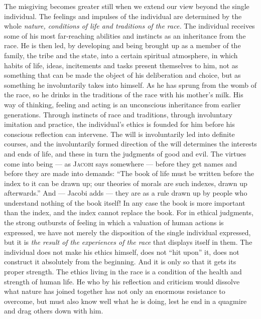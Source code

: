 \documentclass[12pt,a4paper,openany]{book}
\newcommand{\opage}[1]{\marginnote{\footnotesize\textit{[#1]}}}
\begin{document}
The misgiving becomes greater still when we extend our view beyond the single individual. The
feelings and impulses of the individual are determined by the whole \textit{nature, conditions of
life and traditions of the race.} The individual receives some of his most far-reaching abilities
and instincts as an inheritance from the race. He is then led, by developing and being brought up
as a member of the family, the tribe and the state, into a certain spiritual atmosphere, in which
habits of life, ideas, incitements and tasks present themselves to him, not as something that can
be made the object of his deliberation and choice, but as something he involuntarily takes into
himself. As he has sprung from the womb of the race, so he drinks in the traditions of the race
with his mother's milk. His way of thinking, feeling and acting is an unconscious inheritance from
earlier generations. Through instincts of race and traditions, through involuntary imitation and
practice, the individual's ethics is founded for him before his conscious reflection can
intervene. The will is involuntarily led into definite courses, and the involuntarily formed
direction of the will determines the interests and ends of life, and these in turn the judgments
of good and evil. The virtues come into being --- as \textsc{Jacobi} says somewhere --- before they get
names and before they are made into demands: ``The book of life must be written before the index to
it can be drawn up; our theories of morals are such indexes, drawn up afterwards.'' And ---
Jacobi adds --- they are as a rule drawn up by people who understand nothing of the book itself! In
any case the book is more important than the index, and the index cannot replace the book. For in
ethical judgments, the strong outbursts of feeling in which a valuation of human actions is
expressed, we have not merely the disposition of the single individual
\opage{6}expressed, but it is \textit{the result of the experiences of the race} that displays itself in
them. The individual does not make his ethics himself, does not ``hit upon'' it, does not
construct it absolutely from the beginning. And it is only so that it gets its proper strength. The
ethics living in the race is a condition of the health and strength of human life. He who by his
reflection and criticism would dissolve what nature has joined together has not only an enormous
resistance to overcome, but must also know well what he is doing, lest he end in a quagmire and
drag others down with him.
\end{document}
